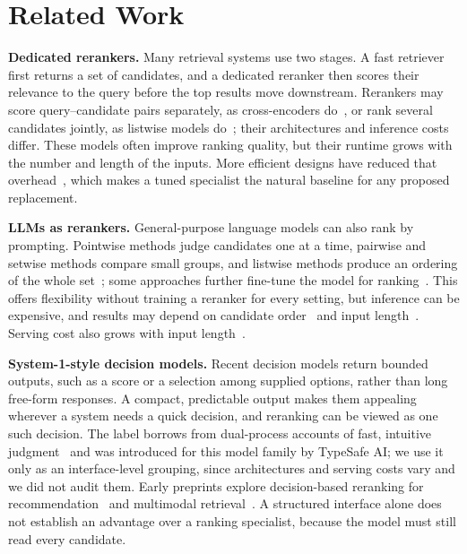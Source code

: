 \documentclass[conference]{IEEEtran}
\begin{document}
{\section{Related Work}
\textbf{Dedicated rerankers.} Many retrieval systems use two stages. A fast retriever first returns a set of candidates, and a dedicated reranker then scores their relevance to the query before the top results move downstream. Rerankers may score query--candidate pairs separately, as cross-encoders do~\cite{nogueira2019bert,nogueira2020monot5}, or rank several candidates jointly, as listwise models do~\cite{ma2023lrl}; their architectures and inference costs differ. These models often improve ranking quality, but their runtime grows with the number and length of the inputs. More efficient designs have reduced that overhead~\cite{nasika2026jina}, which makes a tuned specialist the natural baseline for any proposed replacement.

\textbf{LLMs as rerankers.} General-purpose language models can also rank by prompting. Pointwise methods judge candidates one at a time, pairwise and setwise methods compare small groups, and listwise methods produce an ordering of the whole set~\cite{sun2023rankgpt,ma2023lrl,qin2024prp,zhuang2024setwise}; some approaches further fine-tune the model for ranking~\cite{pradeep2023rankvicuna,pradeep2023rankzephyr}. This offers flexibility without training a reranker for every setting, but inference can be expensive, and results may depend on candidate order~\cite{tang2024found,zheng2024mcq,pezeshkpour2024order,lu2022fantastically} and input length~\cite{liu2024lost,shi2023distracted}. Serving cost also grows with input length~\cite{dao2022flash,kwon2023vllm}.

\textbf{System-1-style decision models.} Recent decision models return bounded outputs, such as a score or a selection among supplied options, rather than long free-form responses. A compact, predictable output makes them appealing wherever a system needs a quick decision, and reranking can be viewed as one such decision. The label borrows from dual-process accounts of fast, intuitive judgment~\cite{stanovich2000individual} and was introduced for this model family by TypeSafe AI; we use it only as an interface-level grouping, since architectures and serving costs vary and we did not audit them. Early preprints explore decision-based reranking for recommendation~\cite{lyu2026decision} and multimodal retrieval~\cite{liu2026multimodal}. A structured interface alone does not establish an advantage over a ranking specialist, because the model must still read every candidate.

}
\end{document}
